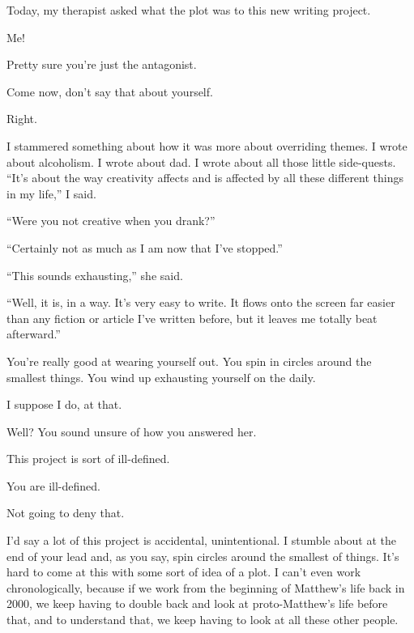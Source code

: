 \label{writing:writing}
\begin{paracol}{2}
\begin{leftcolumn}
\noindent Today, my therapist asked what the plot was to this new writing project.

\begin{ally}
Me!
\end{ally}
Pretty sure you're just the antagonist.

\begin{ally}
Come now, don't say that about yourself.
\end{ally}
Right.

I stammered something about how it was more about overriding themes. I wrote about alcoholism. I wrote about dad. I wrote about all those little side-quests. ``It's about the way creativity affects and is affected by all these different things in my life,'' I said.

``Were you not creative when you drank?''

``Certainly not as much as I am now that I've stopped.''

``This sounds exhausting,'' she said.

``Well, it is, in a way. It's very easy to write. It flows onto the screen far easier than any fiction or article I've written before, but it leaves me totally beat afterward.''

\begin{ally}
You're really good at wearing yourself out. You spin in circles around the smallest things. You wind up exhausting yourself on the daily.
\end{ally}
I suppose I do, at that.

\begin{ally}
Well? You sound unsure of how you answered her.
\end{ally}
This project is sort of ill-defined.

\begin{ally}
You are ill-defined.
\end{ally}
Not going to deny that.

I'd say a lot of this project is accidental, unintentional. I stumble about at the end of your lead and, as you say, spin circles around the smallest of things. It's hard to come at this with some sort of idea of a plot. I can't even work chronologically, because if we work from the beginning of Matthew's life back in 2000, we keep having to double back and look at proto-Matthew's life before that, and to understand that, we keep having to look at all these other people.


\end{leftcolumn}
\end{paracol}
